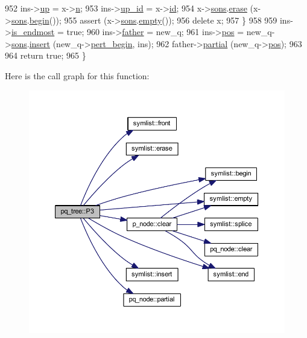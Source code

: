 \begin{DoxyCode}
952     ins->\mbox{\hyperlink{classpq__node_ae6d5a236397b9a57159487eac7ec168d}{up}} = x->\mbox{\hyperlink{classpq__node_a4997fd09a95d9a659b99cea04197740a}{n}};
953     ins->\mbox{\hyperlink{classpq__node_a5a7bcdde1f57191a77a6a14994b38a50}{up\_id}} = x->\mbox{\hyperlink{classpq__node_ad0034c1f93c3c77edb6d3a03f25aba06}{id}};
954         x->\mbox{\hyperlink{classpq__node_a2cc030cfa4560872acea8b50ebd0542b}{sons}}.\mbox{\hyperlink{classsymlist_a75fc1fc7db7b20cc430ddb8577608904}{erase}} (x->\mbox{\hyperlink{classpq__node_a2cc030cfa4560872acea8b50ebd0542b}{sons}}.\mbox{\hyperlink{classsymlist_a525b8d44af5d771fe15916372515cce0}{begin}}());
955         assert (x->\mbox{\hyperlink{classpq__node_a2cc030cfa4560872acea8b50ebd0542b}{sons}}.\mbox{\hyperlink{classsymlist_aca11cd6c621376bc52a18828ef92e753}{empty}}());
956         \textcolor{keyword}{delete} x;
957     \}
958     
959     ins->\mbox{\hyperlink{classpq__node_a058dda3d1197dfd2b343d1983d305d79}{is\_endmost}} = \textcolor{keyword}{true};
960     ins->\mbox{\hyperlink{classpq__node_a3e7c886498c76c633f057fb42ff9c435}{father}} = new\_q;
961     ins->\mbox{\hyperlink{classpq__node_a5e8a5defa0fec4ff2e82fabee97296b4}{pos}} = new\_q->\mbox{\hyperlink{classpq__node_a2cc030cfa4560872acea8b50ebd0542b}{sons}}.\mbox{\hyperlink{classsymlist_a8b3327b8a33b180bf1eb802856f755c3}{insert}} (new\_q->\mbox{\hyperlink{classq__node_ac636443853e4074a0e6c441d7bcb249a}{pert\_begin}}, ins);
962     father->\mbox{\hyperlink{classpq__node_aa6830ab47a280f41fe61b7d2f8b508bb}{partial}} (new\_q->\mbox{\hyperlink{classpq__node_a5e8a5defa0fec4ff2e82fabee97296b4}{pos}});
963     
964     \textcolor{keywordflow}{return} \textcolor{keyword}{true};
965 \}
\end{DoxyCode}
Here is the call graph for this function\+:\nopagebreak
\begin{figure}[H]
\begin{center}
\leavevmode
\includegraphics[width=350pt]{classpq__tree_a8afbdc0f1163021d5ca651c32a1da1d3_cgraph}
\end{center}
\end{figure}
